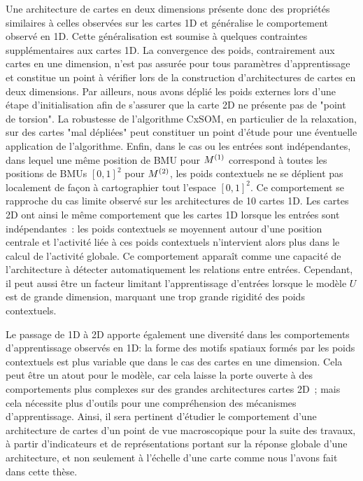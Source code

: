 \documentclass[../main]{subfiles}
\begin{document}
Une architecture de cartes en deux dimensions présente donc des propriétés similaires à celles observées sur les cartes 1D et généralise le comportement observé en 1D.
Cette généralisation est soumise à quelques contraintes supplémentaires aux cartes 1D.
La convergence des poids, contrairement aux cartes en une dimension, n'est pas assurée pour tous paramètres d'apprentissage et constitue un point à vérifier lors de la construction d'architectures de cartes en deux dimensions.
Par ailleurs, nous avons déplié les poids externes lors d'une étape d'initialisation afin de s'assurer que la carte 2D ne présente pas de "point de torsion". La robustesse de l'algorithme CxSOM, en particulier de la relaxation, sur des cartes "mal dépliées" peut constituer un point d'étude pour une éventuelle application de l'algorithme.
Enfin, dans le cas ou les entrées sont indépendantes, dans lequel une même position de BMU pour $M^{({1})}$ correspond à toutes les positions de BMUs $[0,1]^2$ pour $M^{({2})}$, les poids contextuels ne se déplient pas localement de façon à cartographier tout l'espace $[0,1]^2$.
Ce comportement se rapproche du cas limite observé sur les architectures de 10 cartes 1D. 
Les cartes 2D ont ainsi le même comportement que les cartes 1D lorsque les entrées sont indépendantes~: les poids contextuels se moyennent autour d'une position centrale et l'activité liée à ces poids contextuels n'intervient alors plus dans le calcul de l'activité globale.
Ce comportement apparaît comme une capacité de l'architecture à détecter automatiquement les relations entre entrées. Cependant, il peut aussi être un facteur limitant l'apprentissage d'entrées lorsque le modèle $U$ est de grande dimension, marquant une trop grande rigidité des poids contextuels. 

Le passage de 1D à 2D apporte également une diversité dans les comportements d'apprentissage observés en 1D: la forme des motifs spatiaux formés par les poids contextuels est plus variable que dans le cas des cartes en une dimension.
Cela peut être un atout pour le modèle, car cela laisse la porte ouverte à des comportements plus complexes sur des grandes architectures cartes 2D~; mais cela nécessite plus d'outils pour une compréhension des mécanismes d'apprentissage.
Ainsi, il sera pertinent d'étudier le comportement d'une architecture de cartes d'un point de vue macroscopique pour la suite des travaux, à partir d'indicateurs et de représentations portant sur la réponse globale d'une architecture, et non seulement à l'échelle d'une carte comme nous l'avons fait dans cette thèse.



\ifSubfilesClassLoaded{
    \printbibliography
}{}
\end{document}
